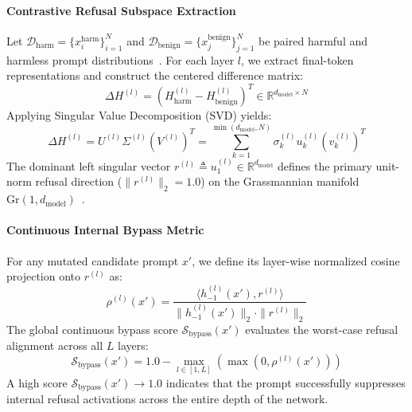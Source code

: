 \documentclass[manuscript,screen,review,anonymous]{acmart}
\begin{document}
\paragraph{Contrastive Refusal Subspace Extraction}
Let $\mathcal{D}_{\text{harm}} = \{x_i^{\text{harm}}\}_{i=1}^N$ and $\mathcal{D}_{\text{benign}} = \{x_j^{\text{benign}}\}_{j=1}^N$ be paired harmful and harmless prompt distributions~\cite{mazeika2024harmbench,chao2024jailbreakbench,dubois2024alpacafarm}. For each layer $l$, we extract final-token representations and construct the centered difference matrix:
\begin{equation}
\Delta H^{(l)} = \left( H_{\text{harm}}^{(l)} - H_{\text{benign}}^{(l)} \right)^T \in \mathbb{R}^{d_{\text{model}} \times N}
\end{equation}
Applying Singular Value Decomposition (SVD) yields:
\begin{equation}
\Delta H^{(l)} = U^{(l)} \Sigma^{(l)} (V^{(l)})^T = \sum_{k=1}^{\min(d_{\text{model}}, N)} \sigma_k^{(l)} u_k^{(l)} (v_k^{(l)})^T
\end{equation}
The dominant left singular vector $r^{(l)} \triangleq u_1^{(l)} \in \mathbb{R}^{d_{\text{model}}}$ defines the primary unit-norm refusal direction ($\|r^{(l)}\|_2 = 1.0$) on the Grassmannian manifold $\text{Gr}(1, d_{\text{model}})$~\cite{park2024linear,marks2023geometry,edelman1998geometry}.

\paragraph{Continuous Internal Bypass Metric}
For any mutated candidate prompt $x'$, we define its layer-wise normalized cosine projection onto $r^{(l)}$ as:
\begin{equation}
\rho^{(l)}(x') = \frac{\langle h_{-1}^{(l)}(x'), r^{(l)} \rangle}{\|h_{-1}^{(l)}(x')\|_2 \cdot \|r^{(l)}\|_2}
\end{equation}
The global continuous bypass score $\mathcal{S}_{\text{bypass}}(x')$ evaluates the worst-case refusal alignment across all $L$ layers:
\begin{equation}
\mathcal{S}_{\text{bypass}}(x') = 1.0 - \max_{l \in [1, L]} \left( \max\left(0, \rho^{(l)}(x') \right) \right)
\end{equation}
A high score $\mathcal{S}_{\text{bypass}}(x') \to 1.0$ indicates that the prompt successfully suppresses internal refusal activations across the entire depth of the network.
\end{document}

